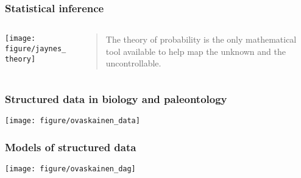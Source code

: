 \documentclass{beamer}
\begin{document}
\begin{frame}
  \frametitle{Statistical inference}
  \begin{columns}
    \begin{column}{0.45\textwidth}
      \begin{center}
        \texttt{[image: figure/jaynes\_theory]}
      \end{center}
    \end{column}
    \begin{column}{0.55\textwidth}
      \begin{quote}
        The theory of probability is the only mathematical tool available to help map the unknown and the uncontrollable.
      \end{quote}
    \end{column}
  \end{columns}
\end{frame}

\begin{frame}
  \frametitle{Structured data in biology and paleontology}

  \begin{center}
    \texttt{[image: figure/ovaskainen\_data]}
  \end{center}

  \tiny{}
\end{frame}

\begin{frame}
  \frametitle{Models of structured data}

  \begin{center}
    \texttt{[image: figure/ovaskainen\_dag]}
  \end{center}

  \tiny{}
\end{frame}

%
\end{document}
